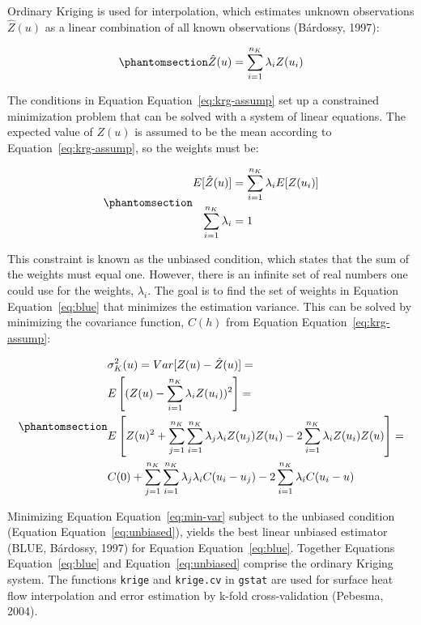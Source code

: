 \documentclass[final]{agujournal2019}
\begin{document}
Ordinary Kriging is used for interpolation, which estimates unknown
observations \(\hat{Z}(u)\) as a linear combination of all known
observations (Bárdossy, 1997):

\begin{equation}\protect\phantomsection\label{eq:blue}{
  \hat{Z}(u) = \sum_{i=1}^{n_K} \lambda_i Z(u_i)
}\end{equation}

The conditions in Equation Equation~\ref{eq:krg-assump} set up a
constrained minimization problem that can be solved with a system of
linear equations. The expected value of \(Z(u)\) is assumed to be the
mean according to Equation~\ref{eq:krg-assump}, so the weights must be:

\begin{equation}\protect\phantomsection\label{eq:unbiased}{
  \begin{aligned}
    E[\hat{Z}(u)] &= \sum_{i=1}^{n_K} \lambda_i E[Z(u_i)] \\
    \sum_{i=1}^{n_K} \lambda_i &= 1
  \end{aligned}
}\end{equation}

This constraint is known as the unbiased condition, which states that
the sum of the weights must equal one. However, there is an infinite set
of real numbers one could use for the weights, \(\lambda_i\). The goal
is to find the set of weights in Equation Equation~\ref{eq:blue} that
minimizes the estimation variance. This can be solved by minimizing the
covariance function, \(C(h)\) from Equation
Equation~\ref{eq:krg-assump}:

\begin{equation}\protect\phantomsection\label{eq:min-var}{
  \begin{aligned}
    & \sigma_K^2(u) = Var[Z(u) - \hat{Z}(u)] = \\
    & E\left[(Z(u) - \sum_{i=1}^{n_K} \lambda_i Z(u_i))^2\right] = \\
    & E\left[Z(u)^2 + \sum_{j=1}^{n_K} \sum_{i=1}^{n_K} \lambda_j \lambda_i Z(u_j)Z(u_i) - 2 \sum_{i=1}^{n_K} \lambda_i Z(u_i)Z(u)\right] = \\
    & C(0) + \sum_{j=1}^{n_K} \sum_{i=1}^{n_K} \lambda_j \lambda_i C(u_i - u_j) - 2 \sum_{i=1}^{n_K} \lambda_i C(u_i - u)
  \end{aligned}
}\end{equation}

Minimizing Equation Equation~\ref{eq:min-var} subject to the unbiased
condition (Equation Equation~\ref{eq:unbiased}), yields the best linear
unbiased estimator (BLUE, Bárdossy, 1997) for Equation
Equation~\ref{eq:blue}. Together Equations Equation~\ref{eq:blue} and
Equation~\ref{eq:unbiased} comprise the ordinary Kriging system. The
functions \texttt{krige} and \texttt{krige.cv} in \texttt{gstat} are
used for surface heat flow interpolation and error estimation by k-fold
cross-validation (Pebesma, 2004).
\end{document}
